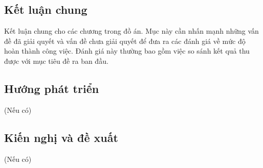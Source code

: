 \documentclass{article} %
\begin{document}
\subsection*{Kết luận chung}
Kết luận chung cho các chương trong đồ án. Mục này cần nhấn mạnh những vấn đề đã giải quyết và vấn đề chưa giải quyết để đưa ra các đánh giá về mức độ hoàn thành công việc. Đánh giá này thường bao gồm việc so sánh kết quả thu được với mục tiêu đề ra ban đầu.
\subsection*{Hướng phát triển}
(Nếu có)
\subsection*{Kiến nghị và đề xuất}
(Nếu có)
\newpage
{}


\newpage
\end{document}
